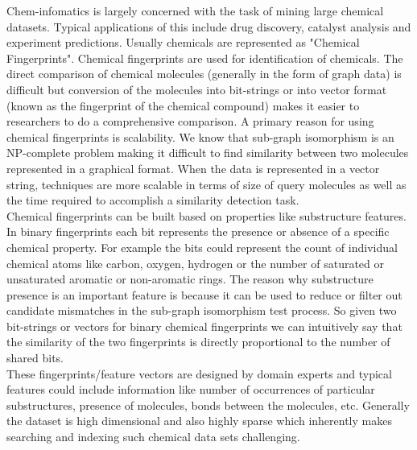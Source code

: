 
%
%

Chem-infomatics is largely concerned with the task of mining large chemical datasets. Typical applications of this include drug discovery, catalyst analysis and experiment predictions. Usually chemicals are represented as "Chemical Fingerprints". Chemical fingerprints are used for identification of chemicals.  The direct comparison of chemical molecules (generally in the form of graph data) is difficult but conversion of the molecules into bit-strings or into vector format (known as the fingerprint of the chemical compound) makes it easier to researchers to do a comprehensive comparison. A primary reason for using chemical fingerprints is scalability. We know that sub-graph isomorphism is an NP-complete problem making it difficult to find similarity between two molecules represented in a graphical format. When the data is represented in a vector string, techniques are more scalable in terms of size of query molecules as well as the time required to accomplish a similarity detection task.\\

Chemical fingerprints can be built based on properties like substructure features. In binary fingerprints each bit represents the presence or absence of a specific chemical property. For example the bits could represent the count of individual chemical atoms like carbon, oxygen, hydrogen or the number of saturated or unsaturated aromatic or non-aromatic rings. The reason why substructure presence is an important feature is because it can be used to reduce or filter out candidate mismatches in the sub-graph isomorphism test process. So given two bit-strings or vectors for binary chemical  fingerprints we can intuitively say that the similarity of the two fingerprints is directly proportional to the number of shared bits. \\

	These fingerprints/feature vectors are designed by domain experts and typical features could include information like number of occurrences of particular substructures, presence of molecules, bonds between the molecules, etc. Generally the dataset is high dimensional and also highly sparse which inherently makes searching and indexing such chemical data sets challenging. \\
	
